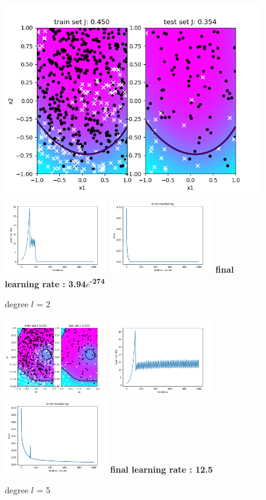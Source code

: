 \documentclass[a4paper]{article}
\begin{document}
	\begin{figure}[h]
	\includegraphics[width=0.4	\textwidth]{logreg_deg2_iter2000.png}
	\includegraphics[width=0.4\textwidth]{logreg_deg2_iter2000_learn.png}
	\includegraphics[width=0.4\textwidth]{logreg_deg2_iter2000_error.png}
	\textbf{final learning rate : 3.94$e$\textsuperscript{-274}}
	\caption{degree $l$ = 2}
\end{figure}
\begin{figure}[h]
	\includegraphics[width=0.4\textwidth]{logreg_deg5_iter2000.png}
	\includegraphics[width=0.4\textwidth]{logreg_deg5_iter2000_learn.png}
	\includegraphics[width=0.4\textwidth]{logreg_deg5_iter2000_error.png}
	\textbf{final learning rate : 12.5}
	\caption{degree $l$ = 5}
\end{figure}
\end{document}
